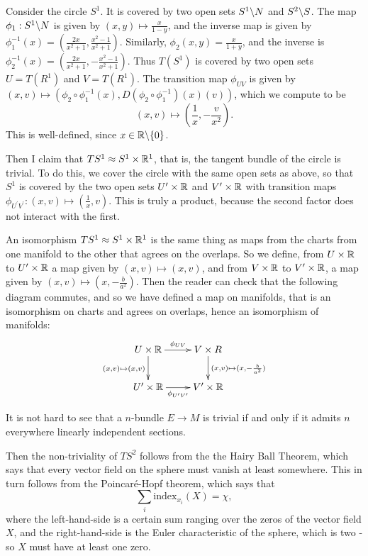 \documentclass[11pt, english]{article}
\begin{document}
\begin{example}
  Consider the circle $S^1$. It is covered by two open sets $S^1 \backslash N$ and $S^2 \backslash S$. The map $\phi_1:S^1 \backslash N$ is given by $(x,y) \mapsto \frac{x}{1-y}$, and the inverse map is given by $\phi_1^{-1}(x)=\left(\frac{2x}{x^2+1}, \frac{x^2-1}{x^2+1} \right)$. Similarly, $\phi_2(x,y) = \frac{x}{1+y}$, and the inverse is $\phi_2^{-1}(x)=\left( \frac{2x}{x^2+1},-\frac{x^2-1}{x^2+1} \right)$. Thus $T(S^1)$ is covered by two open sets $U = T(R^1)$ and $V=T(R^1)$. The transition map $\phi_{UV}$ is given by $(x,v) \mapsto (\phi_2 \circ \phi_1^{-1}(x), D(\phi_2 \circ \phi_1^{-1})(x)(v))$, which we compute to be
\[
(x,v) \mapsto \left (\frac{1}{x}, -\frac{v}{x^2}\right).
\]
This is well-defined, since $x \in \mathbb{R} \backslash \{ 0\}$.

Then I claim that $TS^1 \approx S^1 \times \mathbb{R}^1$, that is, the tangent bundle of the circle is trivial. To do this, we cover the circle with the same open sets as above, so that $S^1$ is covered by the two open sets $U^\prime \times \mathbb{R}$ and $V^\prime \times \mathbb{R}$ with transition maps $\phi_{U^\prime V^\prime}:(x,v) \mapsto (\frac{1}{x}, v)$. This is truly a product, because the second factor does not interact with the first.

An isomorphism $TS^1 \approx S^1 \times \mathbb{R}^1$ is the same thing as maps from the charts from one manifold to the other that agrees on the overlaps. So we define, from $U\times \mathbb{R}$ to $U^\prime \times \mathbb{R}$ a map given by $(x,v) \mapsto (x,v)$, and from $V \times \mathbb{R} $ to $V^\prime \times \mathbb{R}$, a map given by $(x,v) \mapsto \left (x,-\frac{b}{a^2}\right)$. Then the reader can check that the following diagram commutes, and so we have defined a map on manifolds, that is an isomorphism on charts and agrees on overlaps, hence an isomorphism of manifolds:
\[
\xymatrix{
U \times \R \ar@{->}[r]^{\phi_{UV}} \ar@{->}[d]_{(x,v) \mapsto (x,v)} & V \times R \ar@{->}[d]^{(x,v) \mapsto (x,-\frac{b}{a^2})} \\
U^\prime \times \R \ar@{->}[r]_{\phi_{U^\prime V^\prime}} & V^\prime \times \R
}
\]
\end{example}

\begin{example}

It is not hard to see that a $n$-bundle $E \to M$ is trivial if and only if it admits $n$ everywhere linearly independent sections.

Then the non-triviality of $TS^2$ follows from the the Hairy Ball Theorem, which says that every vector field on the sphere must vanish at least somewhere. This in turn follows from the Poincaré-Hopf theorem, which says that
\[
\sum_{i} \mathrm{index}_{x_i}(X) = \chi,
\]
where the left-hand-side is a certain sum ranging over the zeros of the vector field $X$, and the right-hand-side is the Euler characteristic of the sphere, which is two - so $X$ must have at least one zero.

\end{example}
\end{document}
